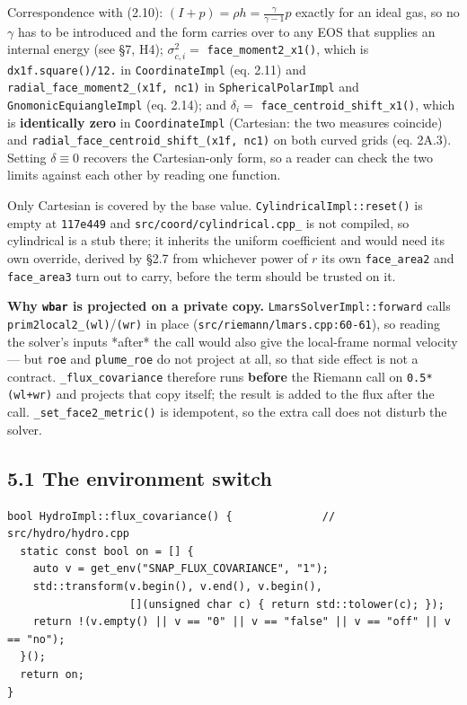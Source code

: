 \documentclass[11pt,a4paper]{article}
\begin{document}
Correspondence with (2.10): $(I+p)=\rho h=\frac{\gamma}{\gamma-1}p$ exactly for an
ideal gas, so no $\gamma$ has to be introduced and the form carries over to any
EOS that supplies an internal energy (see §7, H4);
$\sigma^2_{c,i}=$ \texttt{face\_moment2\_x1()}, which is \texttt{dx1f.square()/12.} in
\texttt{CoordinateImpl} (eq. 2.11) and \texttt{radial\_face\_moment2\_(x1f, nc1)} in
\texttt{SphericalPolarImpl} and \texttt{GnomonicEquiangleImpl} (eq. 2.14); and
$\delta_i=$ \texttt{face\_centroid\_shift\_x1()}, which is \textbf{identically zero} in
\texttt{CoordinateImpl} (Cartesian: the two measures coincide) and
\texttt{radial\_face\_centroid\_shift\_(x1f, nc1)} on both curved grids (eq. 2A.3). Setting
$\delta\equiv0$ recovers the Cartesian-only form, so a reader can check the two
limits against each other by reading one function.

Only Cartesian is covered by the base value. \texttt{CylindricalImpl::reset()} is empty
at \texttt{117e449} and \texttt{src/coord/cylindrical.cpp\_} is not compiled, so cylindrical is
a stub there; it inherits the uniform coefficient and would need its own
override, derived by §2.7 from whichever power of $r$ its own \texttt{face\_area2} and
\texttt{face\_area3} turn out to carry, before the term should be trusted on it.

\textbf{Why \texttt{wbar} is projected on a private copy.} \texttt{LmarsSolverImpl::forward} calls
\texttt{prim2local2\_(wl)}/\texttt{(wr)} in place (\texttt{src/riemann/lmars.cpp:60-61}), so reading
the solver's inputs *after* the call would also give the local-frame normal
velocity — but \texttt{roe} and \texttt{plume\_roe} do not project at all, so that side effect
is not a contract. \texttt{\_flux\_covariance} therefore runs \textbf{before} the Riemann call
on \texttt{0.5*(wl+wr)} and projects that copy itself; the result is added to the flux
after the call. \texttt{\_set\_face2\_metric()} is idempotent, so the extra call does not
disturb the solver.

\subsection*{5.1 The environment switch}

\begin{lstlisting}
bool HydroImpl::flux_covariance() {              // src/hydro/hydro.cpp
  static const bool on = [] {
    auto v = get_env("SNAP_FLUX_COVARIANCE", "1");
    std::transform(v.begin(), v.end(), v.begin(),
                   [](unsigned char c) { return std::tolower(c); });
    return !(v.empty() || v == "0" || v == "false" || v == "off" || v == "no");
  }();
  return on;
}
\end{lstlisting}
\end{document}

